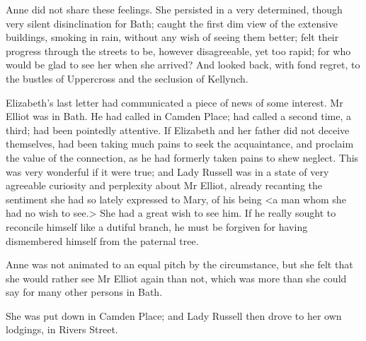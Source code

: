 Anne did not share these feelings. She persisted in a very determined, though very silent disinclination for Bath; caught the first dim view of the extensive buildings, smoking in rain, without any wish of seeing them better; felt their progress through the streets to be, however disagreeable, yet too rapid; for who would be glad to see her when she arrived? And looked back, with fond regret, to the bustles of Uppercross and the seclusion of Kellynch.

Elizabeth's last letter had communicated a piece of news of some interest. Mr Elliot was in Bath. He had called in Camden Place; had called a second time, a third; had been pointedly attentive. If Elizabeth and her father did not deceive themselves, had been taking much pains to seek the acquaintance, and proclaim the value of the connection, as he had formerly taken pains to shew neglect. This was very wonderful if it were true; and Lady Russell was in a state of very agreeable curiosity and perplexity about Mr Elliot, already recanting the sentiment she had so lately expressed to Mary, of his being <a man whom she had no wish to see.> She had a great wish to see him. If he really sought to reconcile himself like a dutiful branch, he must be forgiven for having dismembered himself from the paternal tree.

Anne was not animated to an equal pitch by the circumstance, but she felt that she would rather see Mr Elliot again than not, which was more than she could say for many other persons in Bath.

She was put down in Camden Place; and Lady Russell then drove to her own lodgings, in Rivers Street.